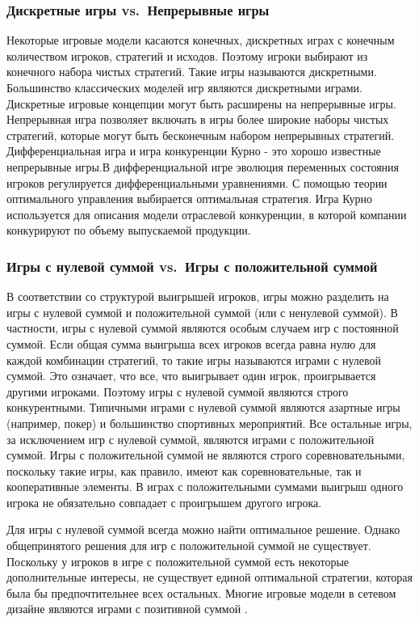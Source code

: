 \subsubsection{Дискретные игры vs.~Непрерывные игры}

Некоторые игровые модели касаются конечных, дискретных играх с конечным
количеством игроков, стратегий и исходов. Поэтому игроки выбирают из
конечного набора чистых стратегий. Такие игры называются дискретными.
Большинство классических моделей игр являются дискретными играми.
Дискретные игровые концепции могут быть расширены на непрерывные игры.
Непрерывная игра позволяет включать в игры более широкие наборы чистых
стратегий, которые могут быть бесконечным набором непрерывных стратегий.
Дифференциальная игра и игра конкуренции Курно - это хорошо известные
непрерывные игры.В дифференциальной игре эволюция переменных состояния
игроков регулируется дифференциальными уравнениями. С помощью теории
оптимального управления выбирается оптимальная стратегия. Игра Курно
используется для описания модели отраслевой конкуренции, в которой
компании конкурируют по объему выпускаемой продукции.

\subsubsection{Игры с нулевой суммой vs.~Игры с положительной суммой}

В соответствии со структурой выигрышей игроков, игры можно разделить на
игры с нулевой суммой и положительной суммой (или с ненулевой суммой). В
частности, игры с нулевой суммой являются особым случаем игр с
постоянной суммой. Если общая сумма выигрыша всех игроков всегда равна
нулю для каждой комбинации стратегий, то такие игры называются играми с
нулевой суммой. Это означает, что все, что выигрывает один игрок,
проигрывается другими игроками. Поэтому игры с нулевой суммой являются
строго конкурентными. Типичными играми с нулевой суммой являются
азартные игры (например, покер) и большинство спортивных мероприятий.
Все остальные игры, за исключением игр с нулевой суммой, являются играми
с положительной суммой. Игры с положительной суммой не являются строго
соревновательными, поскольку такие игры, как правило, имеют как
соревновательные, так и кооперативные элементы. В играх с положительными
суммами выигрыш одного игрока не обязательно совпадает с проигрышем
другого игрока.

Для игры с нулевой суммой всегда можно найти оптимальное решение. Однако
общепринятого решения для игр с положительной суммой не существует.
Поскольку у игроков в игре с положительной суммой есть некоторые
дополнительные интересы, не существует единой оптимальной стратегии,
которая была бы предпочтительнее всех остальных. Многие игровые модели в
сетевом дизайне являются играми с позитивной суммой \cite{Spangler:2003}.

